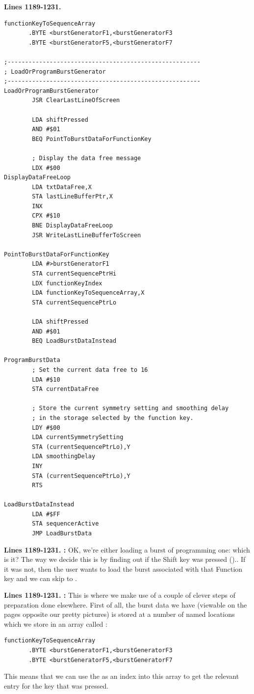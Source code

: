\clearpage
\textbf{Lines 1189-1231. }
\begin{lstlisting}[basicstyle=\ttfamily\scriptsize]
functionKeyToSequenceArray
       .BYTE <burstGeneratorF1,<burstGeneratorF3
       .BYTE <burstGeneratorF5,<burstGeneratorF7

;-------------------------------------------------------
; LoadOrProgramBurstGenerator
;-------------------------------------------------------
LoadOrProgramBurstGenerator   
        JSR ClearLastLineOfScreen

        LDA shiftPressed
        AND #$01
        BEQ PointToBurstDataForFunctionKey

        ; Display the data free message
        LDX #$00
DisplayDataFreeLoop   
        LDA txtDataFree,X
        STA lastLineBufferPtr,X
        INX 
        CPX #$10
        BNE DisplayDataFreeLoop
        JSR WriteLastLineBufferToScreen

PointToBurstDataForFunctionKey   
        LDA #>burstGeneratorF1
        STA currentSequencePtrHi
        LDX functionKeyIndex
        LDA functionKeyToSequenceArray,X
        STA currentSequencePtrLo

        LDA shiftPressed
        AND #$01
        BEQ LoadBurstDataInstead

ProgramBurstData
        ; Set the current data free to 16
        LDA #$10
        STA currentDataFree

        ; Store the current symmetry setting and smoothing delay
        ; in the storage selected by the function key. 
        LDY #$00
        LDA currentSymmetrySetting
        STA (currentSequencePtrLo),Y
        LDA smoothingDelay
        INY 
        STA (currentSequencePtrLo),Y
        RTS 

LoadBurstDataInstead
        LDA #$FF
        STA sequencerActive
        JMP LoadBurstData

\end{lstlisting}
\clearpage

\textbf{Lines 1189-1231. :} OK, we're either loading a burst of programming one: which is it?
The way we decide this is by finding out if the Shift key was pressed ().. If it was not, then the user wants to load the burst associated with
that Function key and we can skip to .

\textbf{Lines 1189-1231. :} This is where we make use of a couple of clever steps of preparation
done elsewhere. First of all, the burst data we have (viewable on the pages opposite our pretty pictures) is stored at a number of named locations
which we store in an array called :
\begin{lstlisting}
functionKeyToSequenceArray
       .BYTE <burstGeneratorF1,<burstGeneratorF3
       .BYTE <burstGeneratorF5,<burstGeneratorF7
\end{lstlisting}
This means that we can use the  as an index into this array to get the relevant entry for the key that was pressed. 

